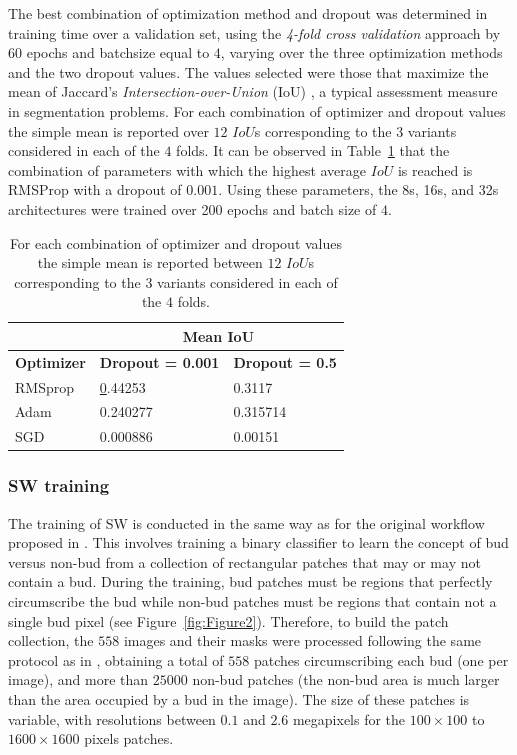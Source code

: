 \documentclass[a4paper,authoryear,review]{elsarticle}
\begin{document}
The best combination of optimization method and dropout was determined in training time over a validation set, using the \emph{4-fold cross validation} approach by 60 epochs and batchsize equal to $4$, varying over the three optimization methods and the two dropout values. The values selected were those that maximize the mean of Jaccard's \emph{Intersection-over-Union} (IoU) \citep{jaccard1912distribution}, a typical assessment measure in segmentation problems. For each combination of optimizer and dropout values the simple mean is reported over $12$ $IoU$s corresponding to the $3$ variants considered in each of the $4$ folds. It can be observed in Table~\ref{tab:Table2} that the combination of parameters with which the highest average $IoU$ is reached is RMSProp with a dropout of $0.001$. Using these parameters, the 8s, 16s, and 32s architectures were trained over 200 epochs and batch size of $4$.

\begin{table}[]
  \centering
       \begin{tabular}{lll}
           \hline
           \multicolumn{1}{|l|}{} & \multicolumn{2}{c|}{\textbf{Mean IoU}} \\ \hline
           \multicolumn{1}{|c|}{\textbf{Optimizer}} & \multicolumn{1}{c|}{\textbf{Dropout = 0.001}} & \multicolumn{1}{c|}{\textbf{Dropout = 0.5}} \\ \hline
           RMSprop & {\ul 0.44253} & 0.3117 \\
           Adam & 0.240277 & 0.315714 \\
           SGD & 0.000886 & 0.00151 \\ \hline
  \end{tabular}%
  \caption{
For each combination of optimizer and dropout values the simple mean is reported between $12$ $IoU$s corresponding to the $3$ variants considered in each of the $4$ folds.
}
    \label{tab:Table2}
\end{table}


\subsubsection{SW training}
\label{sec:swtrain}

The training of SW is conducted in the same way as for the original workflow proposed in \citet{perez2017image}. This involves training a binary classifier to learn the concept of bud versus non-bud from a collection of rectangular patches that may or may not contain a bud. During the training, bud patches must be regions that perfectly circumscribe the bud while non-bud patches must be regions that contain not a single bud pixel (see Figure~\ref{fig:Figure2}). Therefore, to build the patch collection, the $558$ images and their masks were processed following the same protocol as in \citet{perez2017image}, obtaining a total of $558$ patches circumscribing each bud (one per image), and more than $25000$ non-bud patches (the non-bud area is much larger than the area occupied by a bud in the image). The size of these patches is variable, with resolutions between $0.1$ and $2.6$ megapixels for the $100 \times 100$ to $1600 \times 1600$ pixels patches.
\end{document}
